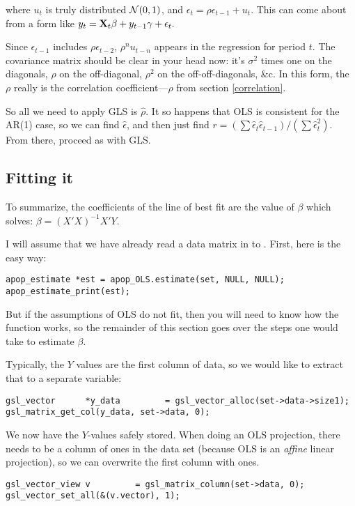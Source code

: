 where $u_t$ is truly distributed ${\cal N}(0,1)$, and $\epsilon_t=
\rho\epsilon_{t-1} + u_t$. This can come about from  a form like
$y_t={\bf X}_t\beta + y_{t-1}\gamma + \epsilon_t.$


Since $\epsilon_{t-1}$ includes $\rho\epsilon_{t-2}$, $\rho^n u_{t-n}$
appears in the regression for period $t$. The covariance matrix should
be clear in your head now: it's $\sigma^2$ times one on the diagonals,
$\rho$ on the off-diagonal, $\rho^2$ on the off-off-diagonals, \&c. In
this form, the $\rho$ really is the correlation coefficient---$\rho$
from section \ref{correlation}.

So all we need to apply GLS is $\hat\rho$. It so happens that OLS is
consistent for the AR(1) case, so we can find $\hat\epsilon$, and then
just find $r=(\sum \hat\epsilon_t \hat\epsilon_{t-1})/(\sum
\hat\epsilon_t^2)$. From there, proceed as with GLS.



\subsection{Fitting it} 
To summarize,
the coefficients of  the line of best fit are the value of $\beta$ which solves:
$ \beta = (X'X)^{-1}X'Y$.

I will assume that we have already read a data matrix in to . First, here is the easy way:
\begin{lstlisting}
apop_estimate *est = apop_OLS.estimate(set, NULL, NULL);
apop_estimate_print(est);
\end{lstlisting}
But if the assumptions of OLS do not fit, then you will need to know how
the  function works, so the remainder of this
section goes over the steps one would take to estimate $\beta$.  

 Typically, the $Y$
values are the first column of data, so we would like to extract that to a separate variable:
\begin{lstlisting}
gsl_vector      *y_data         = gsl_vector_alloc(set->data->size1);
gsl_matrix_get_col(y_data, set->data, 0);
\end{lstlisting}

We now have the $Y$-values safely stored.  When doing an OLS projection,
there needs to be a column of ones in the data set (because OLS is an
{\sl affine} linear projection), so we can overwrite the first column
with ones. 
\begin{lstlisting}
gsl_vector_view v         = gsl_matrix_column(set->data, 0);
gsl_vector_set_all(&(v.vector), 1);  
\end{lstlisting}


